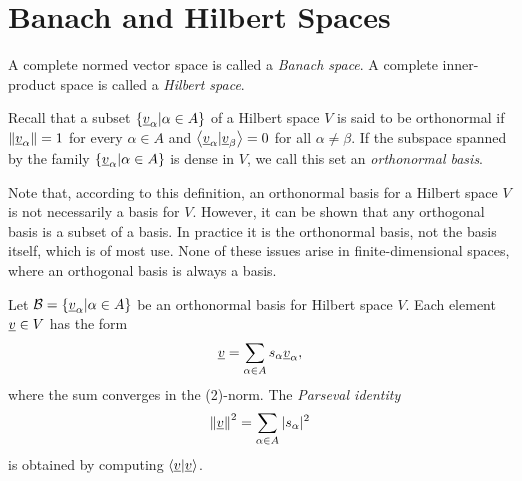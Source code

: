 \section{Banach and Hilbert Spaces}

\begin{definition}
A complete normed vector space is called a \emph{Banach space}.
A complete inner-product space is called a \emph{Hilbert space}.
\end{definition}

\begin{definition}
Recall that a subset $\left\{ \underline{v}_{\alpha} | \alpha \in A \right\}$ of a Hilbert space $V$ is said to be orthonormal if $\left\| \underline{v}_{\alpha} \right\| = 1$ for every $\alpha \in A$ and $\left\langle \underline{v}_{\alpha} | \underline{v}_{\beta} \right\rangle = 0$ for all $\alpha \neq \beta$.
If the subspace spanned by the family $\left\{ \underline{v}_{\alpha} | \alpha \in A \right\}$ is dense in $V$, we call this set an \emph{orthonormal basis}.
\end{definition}

Note that, according to this definition, an orthonormal basis for a Hilbert space $V$ is not necessarily a basis for $V$.
However, it can be shown that any orthogonal basis is a subset of a basis.
In practice it is the orthonormal basis, not the basis itself, which is of most use.
None of these issues arise in finite-dimensional spaces, where an orthogonal basis is always a basis.

Let $\mathcal{B} = \left\{ \underline{v}_{\alpha} | \alpha \in A \right\}$ be an orthonormal basis for Hilbert space $V$.
Each element $\underline{v} \in V$ has the form
\begin{equation*}
\underline{v} = \sum_{\alpha \in A} s_{\alpha} \underline{v}_{\alpha},
\end{equation*}
where the sum converges in the (2)-norm.
The \emph{Parseval identity}
\begin{equation*}
\left\| \underline{v} \right\|^2 = \sum_{\alpha \in A} | s_{\alpha} |^2
\end{equation*}
is obtained by computing $\left\langle \underline{v} | \underline{v} \right\rangle$.

